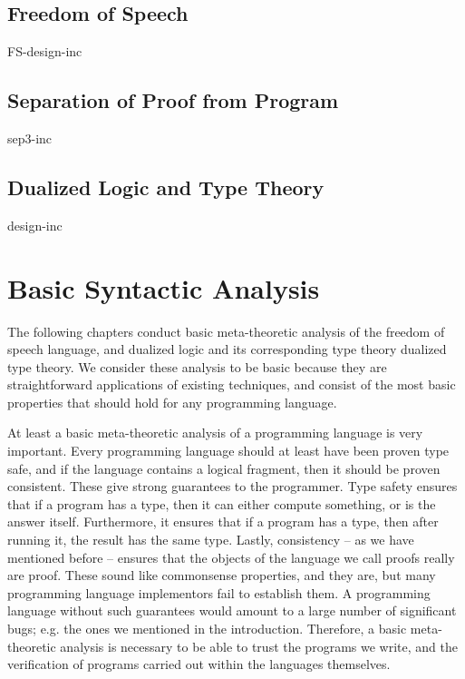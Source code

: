 \documentclass[phd,appendix,dedicationpage,ackpage,epigraphpage]{uithesis}
\begin{document}
\chapter{Freedom of Speech}
\label{chap:freedom_of_speech}
{FS-design-inc}

\chapter{Separation of Proof from Program}
\label{chap:separation_of_proof_from_program}
{sep3-inc}

\chapter{Dualized Logic and Type Theory}
\label{chap:dualized_type_theory_de}
{design-inc}

\part{Basic Syntactic Analysis}
\label{part:basic-analysis}
The following chapters conduct basic meta-theoretic analysis of the
freedom of speech language, and dualized logic and its corresponding
type theory dualized type theory.  We consider these analysis to be
basic because they are straightforward applications of existing
techniques, and consist of the most basic properties that should hold
for any programming language.

At least a basic meta-theoretic analysis of a programming language is
very important.  Every programming language should at least have been
proven type safe, and if the language contains a logical fragment,
then it should be proven consistent.  These give strong guarantees to
the programmer.  Type safety ensures that if a program has a type,
then it can either compute something, or is the answer itself.
Furthermore, it ensures that if a program has a type, then after
running it, the result has the same type.  Lastly, consistency -- as
we have mentioned before -- ensures that the objects of the language
we call proofs really are proof.  These sound like commonsense
properties, and they are, but many programming language implementors
fail to establish them.  A programming language without such
guarantees would amount to a large number of significant bugs;
e.g. the ones we mentioned in the introduction.  Therefore, a basic
meta-theoretic analysis is necessary to be able to trust the programs
we write, and the verification of programs carried out within the
languages themselves.
\end{document}
